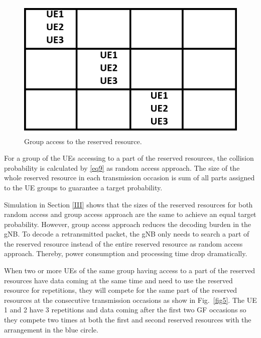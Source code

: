 \documentclass[conference]{IEEEtran}
\begin{document}
\begin{figure}[htbp]
\centerline{\includegraphics[scale=0.35]{fig4.png}}
\caption{Group access to the reserved resource.}
\label{fig4}
\end{figure}

For a group of the UEs accessing to a part of the reserved resources, the collision probability is calculated by \eqref{eq9} as random access approach. The size of the whole reserved resource in each transmission occasion is sum of all parts assigned to the UE groups to guarantee a target probability. 

Simulation in Section \ref{III} shows that the sizes of the reserved resources for both random access and group access approach are the same to achieve an equal target probability. However, group access approach reduces the decoding burden in the gNB. To decode a retransmitted packet, the gNB only needs to search a part of the reserved resource instead of the entire reserved resource as random access approach. Thereby, power consumption and processing time drop dramatically. 

When two or more UEs of the same group having access to a part of the reserved resources have data coming at the same time and need to use the reserved resource for repetitions, they will compete for the same part of the reserved resources at the consecutive transmission occasions as show in Fig.~\ref{fig5}. The UE 1 and 2 have 3 repetitions and data coming after the first two GF occasions so they compete two times at both the first and second reserved resources with the arrangement in the blue circle.
\end{document}
